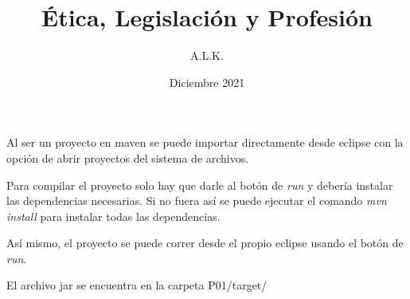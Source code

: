\documentclass[twoside]{AiTeX}
\title{Ética, Legislación y Profesión}
\author{A.L.K.}
\date{Diciembre 2021}
\begin{document}
\portadaApuntes
\pagestyle{empty}
\tableofcontents
\pagestyle{empty}
\justify
\pagestyle{fancy}

\newpage



Al ser un proyecto en maven se puede importar directamente desde eclipse con la opción de abrir proyectos del sistema de archivos.

Para compilar el proyecto solo hay que darle al botón de \textit{run} y debería instalar las dependencias necesarias. Si no fuera así se puede ejecutar el comando \textit{mvn install} para instalar todas las dependencias.

Así mismo, el proyecto se puede correr desde el propio eclipse usando el botón de \textit{run}.

El archivo jar se encuentra en la carpeta P01/target/


\end{document}
